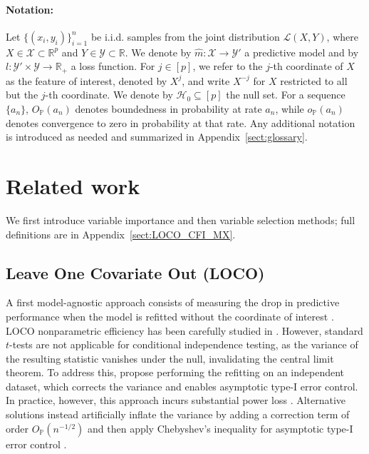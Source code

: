 \documentclass{article}
\theoremstyle{plain}
\theoremstyle{definition}
\theoremstyle{remark}
\begin{document}
 \paragraph{Notation:} Let $\{(x_i, y_i)\}_{i=1}^n$ be i.i.d. samples from the joint distribution $\mathcal{L}(X,Y)$, where $X \in \mathcal{X} \subset \mathbb{R}^p$ and $Y \in \mathcal{Y} \subset \mathbb{R}$. We denote by $\widehat{m} : \mathcal{X} \to \mathcal{Y}'$ a predictive model and by $l : \mathcal{Y}' \times \mathcal{Y} \to \mathbb{R}_+$ a loss function. For $j \in [p]$, we refer to the $j$-th coordinate of $X$ as the feature of interest, denoted by $X^j$, and write $X^{-j}$ for $X$ restricted to all but the $j$-th coordinate. We denote by $\mathcal{H}_0 \subseteq [p]$ the null set. For a sequence $\{a_n\}$, $O_{\mathbb{P}}(a_n)$ denotes boundedness in probability at rate $a_n$, while $o_{\mathbb{P}}(a_n)$ denotes convergence to zero in probability at that rate. Any additional notation is introduced as needed and summarized in Appendix~\ref{sect:glossary}.



\section{Related work}\label{sect:related_work}

We first introduce variable importance and then variable selection methods; full definitions are in Appendix~\ref{sect:LOCO_CFI_MX}.
%
  \subsection{Leave One Covariate Out (LOCO)}
A first model-agnostic approach consists of measuring the drop in predictive performance when the model is refitted without the coordinate of interest \cite{lei2018}. LOCO nonparametric efficiency has been carefully studied in \citet{williamson2021, williamson2023general}. However, standard $t$-tests are not applicable for conditional independence testing, as the variance of the resulting statistic vanishes under the null, invalidating the central limit theorem. To address this, \citet{williamson2023general} propose performing the refitting on an independent dataset, which corrects the variance and enables asymptotic type-I error control. In practice, however, this approach incurs substantial power loss \cite{reyerolobo2025conditionalfeatureimportancerevisited}. Alternative solutions instead artificially inflate the variance by adding a correction term of order $O_{\mathbb{P}}(n^{-1/2})$ and then apply Chebyshev's inequality for asymptotic type-I error control \cite{LocoVSShapley}.
\end{document}
